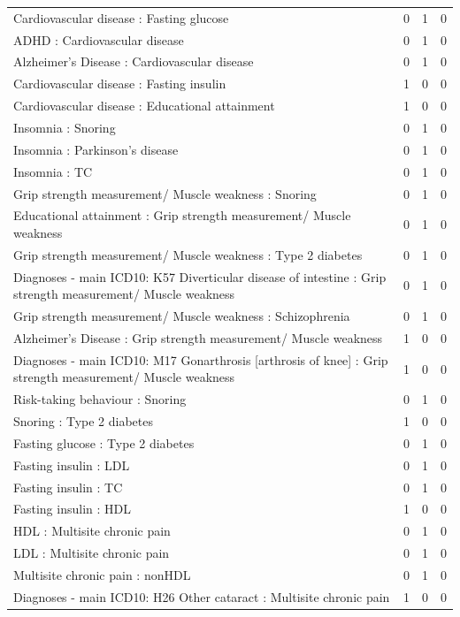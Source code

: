 \begin{table}[ht]
\begin{tabular}{lrrr}
  Cardiovascular disease : Fasting glucose &   0 &   1 &   0 \\ 
  ADHD : Cardiovascular disease &   0 &   1 &   0 \\ 
  Alzheimer's Disease : Cardiovascular disease &   0 &   1 &   0 \\ 
  Cardiovascular disease : Fasting insulin &   1 &   0 &   0 \\ 
  Cardiovascular disease : Educational attainment &   1 &   0 &   0 \\ 
  Insomnia : Snoring &   0 &   1 &   0 \\ 
  Insomnia : Parkinson's disease &   0 &   1 &   0 \\ 
  Insomnia : TC &   0 &   1 &   0 \\ 
  Grip strength measurement/ Muscle weakness : Snoring &   0 &   1 &   0 \\ 
  Educational attainment : Grip strength measurement/ Muscle weakness &   0 &   1 &   0 \\ 
  Grip strength measurement/ Muscle weakness : Type 2 diabetes &   0 &   1 &   0 \\ 
  Diagnoses - main ICD10: K57 Diverticular disease of intestine : Grip strength measurement/ Muscle weakness &   0 &   1 &   0 \\ 
  Grip strength measurement/ Muscle weakness : Schizophrenia &   0 &   1 &   0 \\ 
  Alzheimer's Disease : Grip strength measurement/ Muscle weakness &   1 &   0 &   0 \\ 
  Diagnoses - main ICD10: M17 Gonarthrosis [arthrosis of knee] : Grip strength measurement/ Muscle weakness &   1 &   0 &   0 \\ 
  Risk-taking behaviour : Snoring &   0 &   1 &   0 \\ 
  Snoring : Type 2 diabetes &   1 &   0 &   0 \\ 
  Fasting glucose : Type 2 diabetes &   0 &   1 &   0 \\ 
  Fasting insulin : LDL &   0 &   1 &   0 \\ 
  Fasting insulin : TC &   0 &   1 &   0 \\ 
  Fasting insulin : HDL &   1 &   0 &   0 \\ 
  HDL : Multisite chronic pain &   0 &   1 &   0 \\ 
  LDL : Multisite chronic pain &   0 &   1 &   0 \\ 
  Multisite chronic pain : nonHDL &   0 &   1 &   0 \\ 
  Diagnoses - main ICD10: H26 Other cataract : Multisite chronic pain &   1 &   0 &   0 \\ 

\end{tabular}
\end{table}
